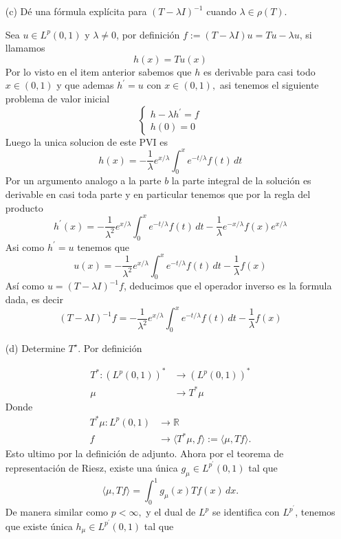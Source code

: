 \begin{itemize}
\begin{sproof}
    \end{sproof}
\item[(c)] Dé una fórmula explícita para $(T-\lambda I)^{-1}$ cuando $\lambda \in \rho(T)$.
    \begin{sproof}
        Sea $u\in L^p(0,1)$ y $\lambda\neq 0$, por definición $f:=(T-\lambda I)u=Tu-\lambda u$, si llamamos
        $$h(x)=Tu(x)$$
        Por lo visto en el item anterior  sabemos que $h$ es derivable para casi todo $x\in(0,1)$ y que ademas $h^\prime=u$ con $x\in(0,1),$ asi tenemos el siguiente problema de valor inicial
        $$\begin{cases}
            h-\lambda h^\prime=f\\
            h(0)=0
        \end{cases}$$
        Luego la unica solucion de este PVI es
        $$h(x)=-\frac{1}{\lambda}e^{x/\lambda}\int_0^xe^{-t/\lambda}f(t)\,dt$$
        Por un argumento analogo a la parte $b$ la parte integral de la solución es derivable en casi toda parte y en particular tenemos que por la regla del producto
        $$h^\prime(x)=-\frac{1}{\lambda^2}e^{x/\lambda}\int_0^xe^{-t/\lambda}f(t)\,dt-\frac{1}{\lambda}e^{-x/\lambda}f(x)e^{x/\lambda}$$
        Asi como $h^\prime=u$ tenemos que
        $$u(x)=-\frac{1}{\lambda^2}e^{x/\lambda}\int_0^xe^{-t/\lambda}f(t)\,dt-\frac{1}{\lambda}f(x)$$
        Así como $u=(T-\lambda I)^{-1}f$, deducimos que el operador inverso es la formula dada, es decir
        $$(T-\lambda I)^{-1}f=-\frac{1}{\lambda^2}e^{x/\lambda}\int_0^xe^{-t/\lambda}f(t)\,dt-\frac{1}{\lambda}f(x)$$
    \end{sproof}
\item[(d)] Determine $T^{\star}$. 
    Por definición
    \begin{sproof} 
    \begin{align*}
        T^*:(L^p(0,1))^*&\to(L^p(0,1))^*\\
        \mu&\to T^*\mu 
    \end{align*}
    Donde 
    \begin{align*}
        T^*\mu:L^p(0,1)&\to \mathbb{R}\\
        f&\to\langle T^*\mu,f\rangle:=\langle\mu,Tf\rangle.
    \end{align*}
    Esto ultimo por la definición de adjunto. Ahora por el teorema de representación de Riesz, existe una única $g_\mu\in L^{p^\prime}(0,1)$ tal que
    $$\langle \mu,Tf\rangle=\int_0^1g_\mu(x)Tf(x)\,dx.$$
    De manera similar como $p<\infty,$ y el dual de $L^p$ se identifica con $L^{p^\prime}$, tenemos que existe única $h_\mu\in L^{p^\prime}(0,1)$ tal que

\end{sproof}
\end{itemize}
